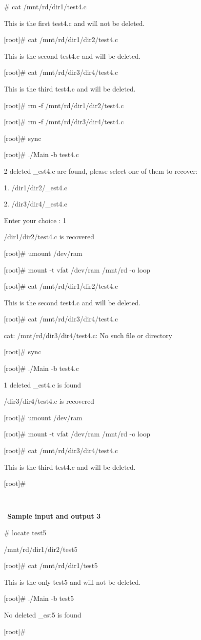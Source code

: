 \documentclass[a4paper,12pt]{article}
\begin{document}
\begin{tt}
[root]\# cat /mnt/rd/dir1/test4.c

This is the first test4.c and will not be deleted.

[root]\# cat /mnt/rd/dir1/dir2/test4.c

This is the second test4.c and will be deleted.

[root]\# cat /mnt/rd/dir3/dir4/test4.c

This is the third test4.c and will be deleted.

[root]\# rm -f /mnt/rd/dir1/dir2/test4.c

[root]\# rm -f /mnt/rd/dir3/dir4/test4.c

[root]\# sync

[root]\# ./Main -b test4.c

2 deleted \_est4.c are found, please select one of them to recover:

1. /dir1/dir2/\_est4.c

2. /dir3/dir4/\_est4.c

Enter your choice : 1

/dir1/dir2/test4.c is recovered

[root]\# umount /dev/ram

[root]\# mount -t vfat /dev/ram /mnt/rd -o loop

[root]\# cat /mnt/rd/dir1/dir2/test4.c

This is the second test4.c and will be deleted.

[root]\# cat /mnt/rd/dir3/dir4/test4.c

cat: /mnt/rd/dir3/dir4/test4.c: No such file or directory

[root]\# sync

[root]\# ./Main -b test4.c

1 deleted \_est4.c is found

/dir3/dir4/test4.c is recovered

[root]\# umount /dev/ram

[root]\# mount -t vfat /dev/ram /mnt/rd -o loop

[root]\# cat /mnt/rd/dir3/dir4/test4.c

This is the third test4.c and will be deleted.

[root]\#

\end{tt}

~

~\noindent \textbf{Sample input and output 3}

\begin{tt}
[root]\# locate test5

/mnt/rd/dir1/dir2/test5

[root]\# cat /mnt/rd/dir1/test5

This is the only test5 and will not be deleted.

[root]\# ./Main -b test5

No deleted \_est5 is found

[root]\#

\end{tt}
\end{document}
